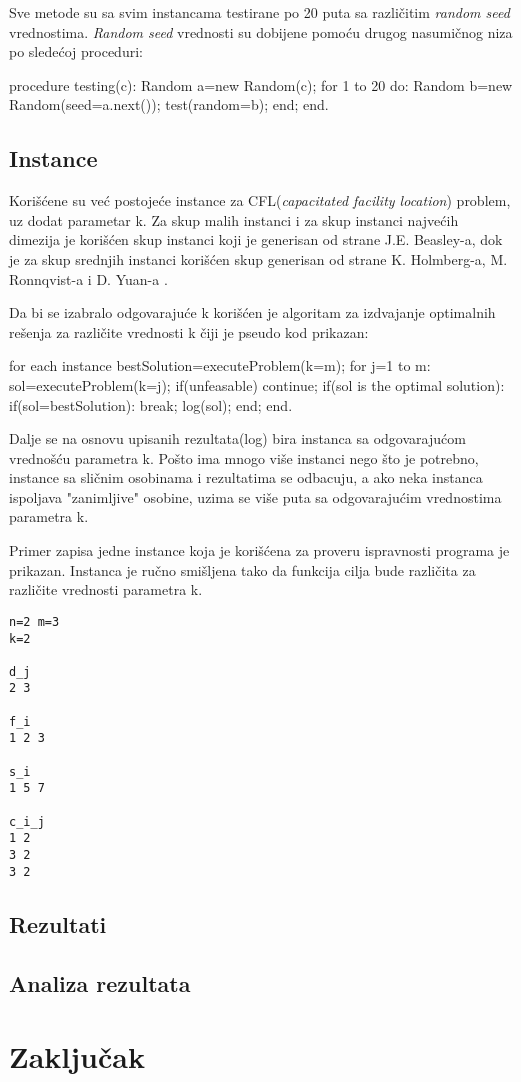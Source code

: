 \documentclass[a4paper]{article}
\begin{document}
Sve metode su sa svim instancama testirane po 20 puta sa različitim \emph{random seed} vrednostima. \emph{Random seed} vrednosti su dobijene pomoću drugog nasumičnog niza po sledećoj proceduri:

\begin{algorithm}
procedure testing(c):
	Random a=new Random(c);
	for 1 to 20 do:
		Random b=new Random(seed=a.next());
		test(random=b);
	end;
end.
\end{algorithm}

\subsection{Instance}
Korišćene su već postojeće instance za CFL(\emph{capacitated facility location}) problem, uz dodat parametar k. Za skup malih instanci i za skup instanci najvećih dimezija je korišćen skup instanci koji je generisan od strane J.E. Beasley-a\cite{beasley}, dok je za skup srednjih instanci korišćen skup generisan od strane K. Holmberg-a, M. Ronnqvist-a i D. Yuan-a \cite{holmberg}.

Da bi se izabralo odgovarajuće k korišćen je algoritam za izdvajanje optimalnih rešenja za različite vrednosti k čiji je pseudo kod prikazan:
\begin{algorithm}
for each instance
	bestSolution=executeProblem(k=m);
	for j=1 to m:
		sol=executeProblem(k=j);
		if(unfeasable)
			continue;
		if(sol is the optimal solution):
			if(sol=bestSolution):
				break;
			log(sol);
	end;
end.
\end{algorithm}

Dalje se na osnovu upisanih rezultata(log) bira instanca sa odgovarajućom vrednošću parametra k. Pošto ima mnogo više instanci nego što je potrebno, instance sa sličnim osobinama i rezultatima se odbacuju, a ako neka instanca ispoljava "zanimljive" osobine, uzima se više puta sa odgovarajućim vrednostima parametra k.

Primer zapisa jedne instance koja je korišćena za proveru ispravnosti programa je prikazan. Instanca je ručno smišljena tako da funkcija cilja bude različita za različite vrednosti parametra k.
\begin{lstlisting}
n=2 m=3
k=2

d_j
2 3

f_i
1 2 3

s_i
1 5 7

c_i_j
1 2 
3 2
3 2
\end{lstlisting}
\subsection{Rezultati}
\subsection{Analiza rezultata}
\section{Zaključak}


\appendix
 

\end{document}
